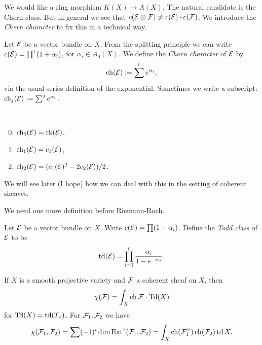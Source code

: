 We would like a ring morphism $K(X) \to A(X)$. The natural candidate is the Chern class. But in general we see that $c(\mathcal{E} \otimes \mathcal{F}) \neq c(\mathcal{E})\cdot c(\mathcal{F})$. We introduce the \emph{Chern character} to fix this in a technical way.

\begin{definition}
	Let $\mathcal{E}$ be a vector bundle on $X$. From the splitting principle we can write $c(\mathcal{E}) = \prod^r (1 + \alpha_i)$, for $\alpha_i \in A_0(X)$. 
	We define the \emph{Chern character} of $\mathcal{E}$ by \[
    	\operatorname{ch}(\mathcal{E}) := \sum^r e^{\alpha_i}, 
    \] via the usual series definition of the exponential. Sometimes we write a subscript: $\operatorname{ch}_j(\mathcal{E}) := \sum^j e^{\alpha_i}$.
\end{definition}

\begin{example}~
	\begin{enumerate}
		\setcounter{enumi}{-1}
    	\item $\operatorname{ch}_0(\mathcal{E}) = \operatorname{rk}(\mathcal{E})$,
		\item $\operatorname{ch}_1(\mathcal{E}) = c_1(\mathcal{E})$,
		\item $\operatorname{ch}_2(\mathcal{E}) = (c_1(\mathcal{E})^2 - 2c_2(\mathcal{E}))/{2}$.
    \end{enumerate}
\end{example}

We will see later (I hope) how we can deal with this in the setting of coherent sheaves.

We need one more definition before Riemann-Roch.

\begin{definition}
	Let $\mathcal{E}$ be a vector bundle on $X$. Write $c(\mathcal{E}) = \prod (1+\alpha_i)$. 
	Define the \emph{Todd class} of $\mathcal{E}$ to be \[
    	\operatorname{td}(\mathcal{E}) = \prod^r_{i=1} \frac{\alpha_i}{1-e^{-\alpha_i}}.
    \]
\end{definition}

\begin{theorem}
	If $X$ is a smooth projective variety and $\mathcal{F}$ a coherent sheaf on $X$, then \[
    	\chi(\mathcal{F}) = \int_X \operatorname{ch}{\mathcal{F}} \cdot \operatorname{Td}(X)
    \] for $\operatorname{Td}(X) = \operatorname{td}(T_x)$.
	\newline
	For $\mathcal{F}_1, \mathcal{F}_2$ we have \[
    	\chi(\mathcal{F}_1, \mathcal{F}_2) = \sum (-1)^i \dim \operatorname{Ext}^1(\mathcal{F}_1, \mathcal{F}_2) = \int_X \operatorname{ch}(\mathcal{F}_1^\vee)\operatorname{ch}(\mathcal{F}_2) \operatorname{td}{X}.
    \]
\end{theorem}
